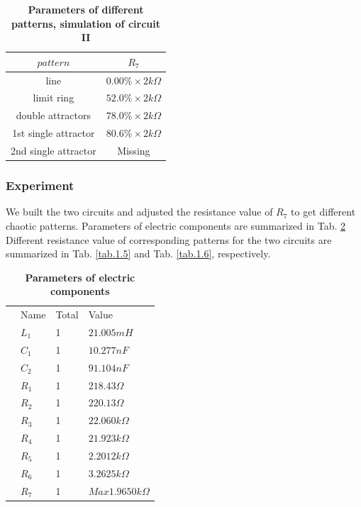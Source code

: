\documentclass[12pt,a4paper,UTF8]{article}
\begin{document}
            \begin{table}[htbp]
                \centering
                \caption{\textbf{Parameters of different patterns, simulation of circuit II}}
                \label{tab.1.3}
                    \begin{tabular}{cc}
                        \toprule
                        $pattern$	&$R_7$ \\
                        \midrule
                        line	&$ 0.00\% \times 2k\Omega$	\\
                        limit ring	&$ 52.0\% \times 2k\Omega$	\\
                        double attractors	&$ 78.0\% \times 2k\Omega$	\\
                        1st single attractor	&$ 80.6\% \times 2k\Omega$	\\
                        2nd single attractor	&Missing	\\
                        \bottomrule
                    \end{tabular}
            \end{table}

        \subsubsection{Experiment}
        We built the two circuits and adjusted the resistance value of $R_7$ to get different chaotic patterns.
        Parameters of electric components are summarized in Tab. \ref{tab.1.4}
        Different resistance value of corresponding patterns for the two circuits are summarized in Tab. \ref{tab.1.5} and Tab. \ref{tab.1.6}, respectively.
        
        \begin{table}[htbp]
            \centering
            \caption{\textbf{Parameters of electric components}}
            \label{tab.1.4}
                \begin{tabular}{llll}
                    \toprule
                    &Name &Total &Value \\
                    &$L_1$	&1	&$21.005 mH$    \\    
                    &$C_1$	&1	&$10.277 nF$    \\    
                    &$C_2$	&1	&$91.104 nF$    \\    
                    &$R_1$	&1	&$218.43 \Omega$    \\    
                    &$R_2$	&1	&$220.13 \Omega$    \\    
                    &$R_3$	&1	&$22.060k \Omega$    \\    
                    &$R_4$	&1	&$21.923k \Omega$    \\    
                    &$R_5$	&1	&$2.2012k \Omega$    \\    
                    &$R_6$	&1	&$3.2625k \Omega$    \\    
                    &$R_7$	&1	&$Max 1.9650k \Omega$    \\    
                    \bottomrule
                \end{tabular}
        \end{table}	
\end{document}
